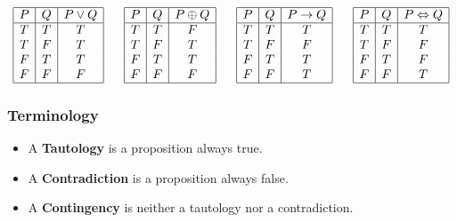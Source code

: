 \documentclass{article}
\begin{document}
\renewcommand{\arraystretch}{1.5} %
\begin{center}
\[
\begin{array}{|c|c|c|} \hline %
P & Q & P \vee Q\\ \hline
T & T & T\\
T & F & T\\
F & T & T\\
F & F & F\\
\hline
\end{array} \mkern30mu %
\begin{array}{|c|c|c|} \hline %
P & Q & P \oplus Q\\ \hline
T & T & F\\
T & F & T\\
F & T & T\\
F & F & F\\
\hline
\end{array} \mkern30mu  %
\begin{array}{|c|c|c|} \hline %
P & Q & P \rightarrow Q\\ \hline
T & T & T\\
T & F & F\\
F & T & T\\
F & F & T\\
\hline
\end{array} \mkern30mu  %
\begin{array}{|c|c|c|} \hline %
P & Q & P \Leftrightarrow Q\\ \hline
T & T & T\\
T & F & F\\
F & T & F\\
F & F & T\\
\hline
\end{array}  %
\]
\end{center}

\subsubsection{Terminology}
\begin{itemize}
\item A \textbf{Tautology} is a proposition always true.
\item A \textbf{Contradiction} is a proposition always false.
\item A \textbf{Contingency} is neither a tautology nor a contradiction.
\end{itemize}
\end{document}
